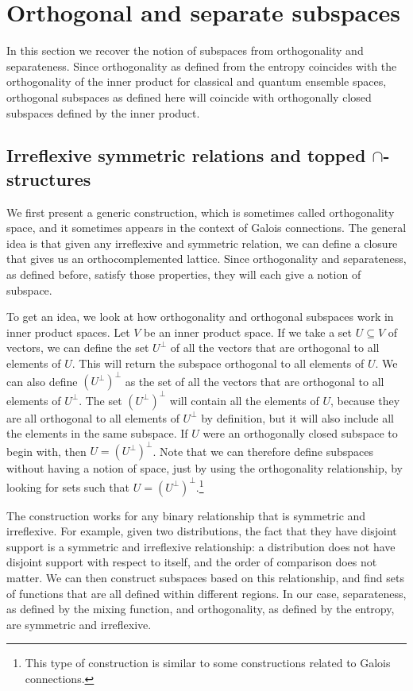 \section{Orthogonal and separate subspaces}\label{pm-es-subspaceSection}

In this section we recover the notion of subspaces from orthogonality and separateness. Since orthogonality as defined from the entropy coincides with the orthogonality of the inner product for classical and quantum ensemble spaces, orthogonal subspaces as defined here will coincide with orthogonally closed subspaces defined by the inner product.

\subsection{Irreflexive symmetric relations and topped $\cap$-structures}

We first present a generic construction, which is sometimes called orthogonality space, and it sometimes appears in the context of Galois connections. The general idea is that given any irreflexive and symmetric relation, we can define a closure that gives us an orthocomplemented lattice. Since orthogonality and separateness, as defined before, satisfy those properties, they will each give a notion of subspace.

To get an idea, we look at how orthogonality and orthogonal subspaces work in inner product spaces. Let $V$ be an inner product space. If we take a set $U \subseteq V$ of vectors, we can define the set $U^{\perp}$ of all the vectors that are orthogonal to all elements of $U$. This will return the subspace orthogonal to all elements of $U$. We can also define $(U^{\perp})^{\perp}$ as the set of all the vectors that are orthogonal to all elements of $U^{\perp}$. The set $(U^{\perp})^{\perp}$ will contain all the elements of $U$, because they are all orthogonal to all elements of $U^{\perp}$ by definition, but it will also include all the elements in the same subspace. If $U$ were an orthogonally closed subspace to begin with, then $U = (U^{\perp})^{\perp}$. Note that we can therefore define subspaces without having a notion of space, just by using the orthogonality relationship, by looking for sets such that $U = (U^{\perp})^{\perp}$.\footnote{This type of construction is similar to some constructions related to Galois connections.}

The construction works for any binary relationship that is symmetric and irreflexive. For example, given two distributions, the fact that they have disjoint support is a symmetric and irreflexive relationship: a distribution does not have disjoint support with respect to itself, and the order of comparison does not matter. We can then construct subspaces based on this relationship, and find sets of functions that are all defined within different regions. In our case, separateness, as defined by the mixing function, and orthogonality, as defined by the entropy, are symmetric and irreflexive.

